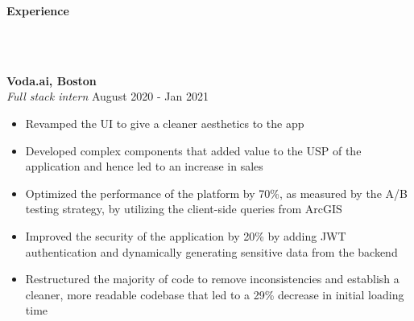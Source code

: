 \documentclass[]{article}
\newcommand{\lineunder} {
    \vspace*{-8pt} \\
    \hrulefill \\
}
\newcommand{\header} [1] {
    {\vspace*{6pt} \fontsize{12}{12}\selectfont \textbf{#1}}
     \lineunder
}
\begin{document}
\header{Experience}
\vspace{1mm}

\hspace{1mm}
\textbf{Voda.ai, Boston}\\
\hspace{1mm}
\textit{Full stack intern} \hfill August 2020 - Jan 2021\\
\vspace{-3mm}
\begin{itemize}
    \setlength\itemsep{-1mm}
    \item Revamped the UI to give a cleaner aesthetics to the app
    \item Developed complex components that added value to the USP of the application and hence led to an increase in sales
    \item Optimized the performance of the platform by 70\%, as measured by the A/B testing strategy, by utilizing the client-side queries from ArcGIS
    \item Improved the security of the application by 20\% by adding JWT authentication and dynamically generating sensitive data from the backend
    \item Restructured the majority of code to remove inconsistencies and establish a cleaner, more readable codebase that led to a 29\% decrease in initial loading time
\end{itemize}
\vspace{-2mm}
\end{document}
